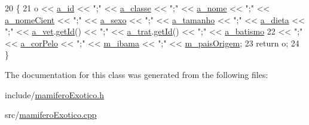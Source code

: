 \begin{DoxyCode}
20 \{
21     o << \hyperlink{classAnimal_a1eab12d1133a739dc0fea720cf6cc927}{a\_id} << \textcolor{stringliteral}{";"} << \hyperlink{classAnimal_a1f32b4455559489b5f5dce71913a6f8f}{a\_classe} << \textcolor{stringliteral}{";"} << \hyperlink{classAnimal_ad815bbe345d7c5274858ac8ccb24bc52}{a\_nome} << \textcolor{stringliteral}{";"} << 
      \hyperlink{classAnimal_af2ae0fc23b0eaf3edaee4579f6199dfc}{a\_nomeCient} << \textcolor{stringliteral}{";"} << \hyperlink{classAnimal_af2b1c520d145f82af7a5a88bb4271a0d}{a\_sexo} << \textcolor{stringliteral}{";"} << \hyperlink{classAnimal_a72366b060dfdbc0dd074fbe41decfcc2}{a\_tamanho} << \textcolor{stringliteral}{";"} << 
      \hyperlink{classAnimal_a32088524517a531af269e3ec04275135}{a\_dieta} << \textcolor{stringliteral}{";"} << \hyperlink{classAnimal_a12ce5681957e27dae674cbbde7fb1e4f}{a\_vet}.\hyperlink{classFuncionario_a0288286a907e587b7ab75d6c23354a06}{getId}() << \textcolor{stringliteral}{";"} << \hyperlink{classAnimal_a19fbf607b29b06a86f598dd1ffb8c712}{a\_trat}.\hyperlink{classFuncionario_a0288286a907e587b7ab75d6c23354a06}{getId}() << \textcolor{stringliteral}{";"} << 
      \hyperlink{classAnimal_a4e308163c5b3d82e546fb39b399bcb71}{a\_batismo}
22     << \textcolor{stringliteral}{";"} << \hyperlink{classMamifero_a7fed480798de8d55d17b3fd8cfdb24fb}{a\_corPelo} << \textcolor{stringliteral}{";"} << \hyperlink{classAnimalSilvestre_a4c92c625318b23e550b8bb24fb934d14}{m\_ibama} << \textcolor{stringliteral}{";"} << \hyperlink{classExotico_a4ac7dec507f3420f4c96318c22ec6f36}{m\_paisOrigem};
23     \textcolor{keywordflow}{return} o;
24 \}\end{DoxyCode}


The documentation for this class was generated from the following files\+:\begin{DoxyCompactItemize}
\item 
include/\hyperlink{mamiferoExotico_8h}{mamifero\+Exotico.\+h}\item 
src/\hyperlink{mamiferoExotico_8cpp}{mamifero\+Exotico.\+cpp}\end{DoxyCompactItemize}
